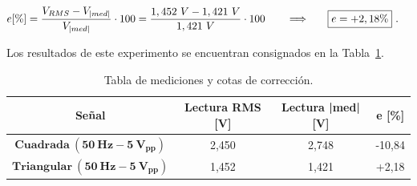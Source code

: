       \begin{align*}
        e [\%] = \dfrac{V_{RMS} - V_{|med|}}{V_{|med|}} \cdot 100
               = \dfrac{1,452~V - 1,421~V}{1,421~V} \cdot 100
               \hspace{20pt} \Longrightarrow \hspace{20pt} \Aboxed{e = +2,18\%}~.
      \end{align*}

    Los resultados de este experimento se encuentran consignados en la
    Tabla~\ref{tab:MedicionesOndasCuadYTrian}.
  
    \begin{table}[H] \centering
      \begin{tabular}{|c|c|c|c|} \hline
        \textbf{Señal}     & \textbf{Lectura RMS [V]}  & \textbf{Lectura |med| [V]} & \textbf{e [\%]} \\ \hline
      $\mathbf{Cuadrada~(50~Hz - 5~V_{pp})}$    & 2,450     & 2,748         &  -10,84        \\ \hline
      $\mathbf{Triangular~(50~Hz - 5~V_{pp})}$  & 1,452      & 1,421        &  +2,18         \\ \hline
      \end{tabular}
      \caption{Tabla de mediciones y cotas de corrección.}
      \label{tab:MedicionesOndasCuadYTrian}
    \end{table}
